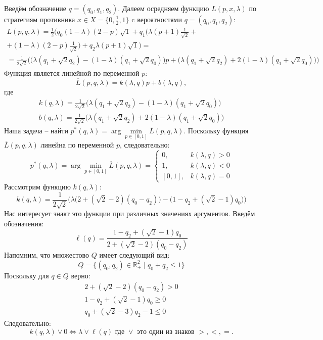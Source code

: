 Введём обозначение $q=(q_0,q_1,q_2)$. Далеем осредняем 
функцию $L(p,x,\lambda)$ по стратегиям противника $x \in X=\{0,\frac{1}{2},1\}$ 
c вероятностями $q=(q_0,q_1,q_2)$:
\begin{multline*} 
	\overline{L}(p,q,\lambda)=
	\frac{1}{2} 
	\Big(
		q_0(1-\lambda)(2-p)\sqrt{1}+
		q_1 \big (\lambda(p+1)\frac{1}{\sqrt{2}} + \\
		+(1-\lambda)(2-p)\frac{1}{\sqrt{2}} \big )+
		q_2\lambda(p+1)\sqrt{1}
	\Big)=
	\\
	=\frac{1}{2\sqrt{2}}
	\Big (
		\big (\lambda(q_1+\sqrt{2}q_2)-(1-\lambda)(q_1+\sqrt{2}q_0) \big)p+
		\big (\lambda(q_1+\sqrt{2}q_2)+2(1-\lambda)(q_1+\sqrt{2}q_0) \big)
	\Big)
\end{multline*}
Функция является линейной по переменной $p$:
$$
	\overline{L}(p,q,\lambda)=k(\lambda,q)p+b(\lambda,q),
$$
где
\begin{gather*}
	k(q, \lambda) = \frac{1}{2\sqrt{2}}
	\big (\lambda(q_1+\sqrt{2}q_2)-(1-\lambda)(q_1+\sqrt{2}q_0) \big)	
	\\
	b(q, \lambda) = \frac{1}{2\sqrt{2}}
	\big (\lambda(q_1+\sqrt{2}q_2)+2(1-\lambda)(q_1+\sqrt{2}q_0) \big)
\end{gather*}
Наша задача -- найти 
$p^*(q, \lambda)=\arg \min \limits_{p \in [0, 1]} \overline{L}(p,q,\lambda)$.
Поскольку функция $\overline{L}(p,q,\lambda)$ линейна по переменной 
$p$, следовательно:
$$
	p^*(q, \lambda) =
	\arg \min \limits_{p \in [0, 1]} \overline{L}(p,q,\lambda) =
	\begin{cases}
		0, & k(\lambda,q)>0 \\
		1, & k(\lambda,q)<0 \\
		[0,1], & k(\lambda,q)=0
	\end{cases}	
$$
Рассмотрим функцию $k(q, \lambda)$:
$$
	k(q, \lambda)=\frac{1}{2\sqrt{2}}
	\Big(
		\lambda \big (2+(\sqrt{2}-2)(q_0-q_2) \big) -
		\big (1 - q_2 + (\sqrt{2} - 1)q_0 \big)
	\Big)
$$
Нас интересует знакт это функции при различных значениях аргументов.
Введём обозначения:
$$
	\ell(q) = \frac{1 - q_2 + (\sqrt{2} - 1)q_0}{2+(\sqrt{2}-2)(q_0-q_2)}
$$
Напомним, что множестово $Q$ имеет следующий вид:
$$
	Q = \{
		(q_0,q_2) \in \mathbb{R}^2_{+} \; | \;
		q_0 + q_2 \leqslant 1
	\}	
$$	
Поскольку для $q \in Q$ верно: 
\begin{gather*}
	2+(\sqrt{2}-2)(q_0-q_2) > 0 
	\\
	1 - q_2 + (\sqrt{2} - 1)q_0 \geqslant 0 
	\\
	q_0 + (\sqrt{2} - 3) q_2 - 1 \leqslant 0
\end{gather*}
Следовательно:
$$
	k(q, \lambda) \vee 0 \Leftrightarrow 
	\lambda \vee \ell(q) \textrm{ где } \vee 
	\textrm{ это один из знаков } >,<,=.
$$
	
